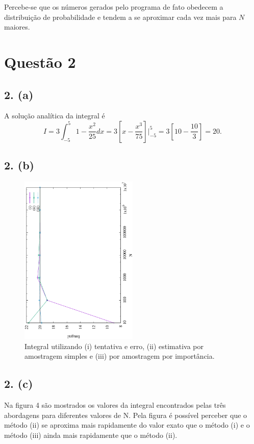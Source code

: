 \documentclass[brazilian, 12pt, a4paper, final]{article}
\begin{document}
Percebe-se que os números gerados pelo programa de fato obedecem a distribuição de probabilidade e tendem a se aproximar cada vez mais para $N$ maiores.


\section*{Questão 2}
\subsection*{2. (a)}
A solução analítica da integral é
\begin{equation*}
	I=3\int_{-5}^{5} 1-\frac{x^2}{25} dx=3\left[x-\frac{x^3}{75}\right]\bigg\rvert_{-5}^{5}=3\left[10-\frac{10}{3}\right]=20.
\end{equation*}

\subsection*{2. (b)}
\begin{figure}[htbp]
  \centering
  \includegraphics[width=0.5\textwidth,angle=-90]{Q2/IQ2.eps}
  \caption{Integral utilizando (i) tentativa e erro, (ii) estimativa por amostragem simples e (iii) por amostragem por importância.}
\end{figure}

\subsection*{2. (c)}
Na figura 4 são mostrados os valores da integral encontrados pelas três abordagens para diferentes valores de N. Pela figura é possível perceber que o método (ii) se aproxima mais rapidamente do valor exato que o método (i) e o método (iii) ainda mais rapidamente que o método (ii).
\end{document}
